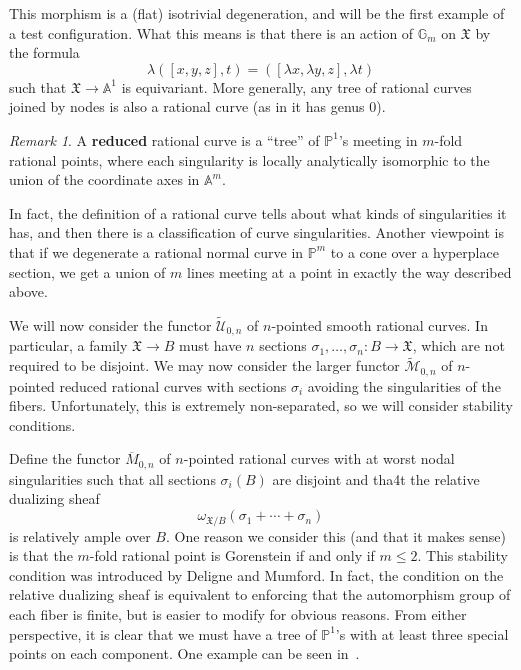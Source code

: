 \documentclass{amsart}
\theoremstyle{definition}
\theoremstyle{remark}
\newtheorem{rmk}[thm]{Remark}
\theoremstyle{plain}
\theoremstyle{definition}
\theoremstyle{remark}
\newcommand{\A}{\mathbb{A}}
\newcommand{\G}{\mathbb{G}}
\renewcommand{\P}{\mathbb{P}}
\newcommand{\mc}[1]{\mathcal{#1}}
\newcommand{\mf}[1]{\mathfrak{#1}}
\newcommand{\ol}[1]{\overline{#1}}
\newcommand{\wt}[1]{\widetilde{#1}}
\newcommand{\1}{\mathbf{1}}
\newcommand{\2}{\mathbf{2}}
\newcommand{\3}{\mathbf{3}}
\begin{document}
This morphism is a (flat) isotrivial degeneration, and will be the first example of a test configuration. What this means is that there is an action of \(\G_m\) on \(\mf{X}\) by the formula
\[ \lambda ([x,y,z],t) = ([\lambda x, \lambda y, z], \lambda t) \]
such that \(\mf{X} \to \A^1\) is equivariant. More generally, any tree of rational curves joined by nodes is also a rational curve (as in it has genus \(0\)). 

\begin{rmk}
    A \textbf{reduced} rational curve is a ``tree'' of \(\P^1\)'s meeting in \(m\)-fold rational points, where each singularity is locally analytically isomorphic to the union of the coordinate axes in \(\A^m\).

    In fact, the definition of a rational curve tells about what kinds of singularities it has, and then there is a classification of curve singularities. Another viewpoint is that if we degenerate a rational normal curve in \(\P^m\) to a cone over a hyperplace section, we get a union of \(m\) lines meeting at a point in exactly the way described above.
\end{rmk}

We will now consider the functor \(\wt{\mc{U}}_{0,n}\) of \(n\)-pointed smooth rational curves. In particular, a family \(\mf{X} \to B\) must have \(n\) sections \(\sigma_1, \ldots, \sigma_n \colon B \to \mf{X}\), which are not required to be disjoint. We may now consider the larger functor \(\wt{\mc{M}}_{0,n}\) of \(n\)-pointed reduced rational curves with sections \(\sigma_i\) avoiding the singularities of the fibers. Unfortunately, this is extremely non-separated, so we will consider stability conditions.

Define the functor \(\ol{M}_{0,n}\) of \(n\)-pointed rational curves with at worst nodal singularities such that all sections \(\sigma_i(B)\) are disjoint and tha4t the relative dualizing sheaf 
\[ \omega_{\mf{X}/B}(\sigma_1 + \cdots + \sigma_n)\]
is relatively ample over \(B\). One reason we consider this (and that it makes sense) is that the \(m\)-fold rational point is Gorenstein if and only if \(m \leq 2\). This stability condition was introduced by Deligne and Mumford. In fact, the condition on the relative dualizing sheaf is equivalent to enforcing that the automorphism group of each fiber is finite, but is easier to modify for obvious reasons. From either perspective, it is clear that we must have a tree of \(\P^1\)'s with at least three special points on each component. One example can be seen in~.
\end{document}
